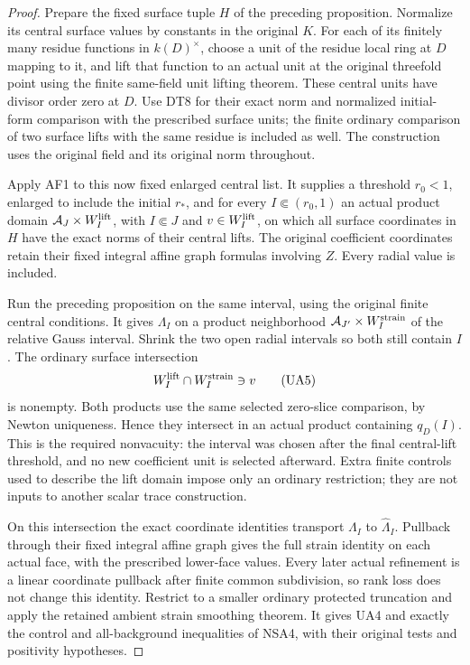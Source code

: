 \begin{proof}
Prepare the fixed surface tuple \(H\) of the preceding
proposition.  Normalize its central surface values
by constants in the original \(K\).  For each of its
finitely many residue functions in \(k(D)^\times\),
choose a unit of the residue local ring at \(D\)
mapping to it, and lift that function to an actual
unit at the original threefold point using the
finite same-field unit lifting theorem.  These
central units have divisor order zero at \(D\).
Use DT8 for their exact norm and normalized
initial-form comparison with the prescribed
surface units; the finite ordinary comparison
of two surface lifts with the same residue is
included as well.  The construction uses the
original field and its original norm throughout.

Apply AF1 to this now fixed enlarged central list.
It supplies a threshold \(r_0<1\), enlarged to
include the initial \(r_*\), and for every
\(I\Subset(r_0,1)\) an actual product domain
\(\mathcal A_J\times W_I^{\rm lift}\), with
\(I\Subset J\) and \(v\in W_I^{\rm lift}\),
on which all surface coordinates in \(H\) have
the exact norms of their central lifts.  The
original coefficient coordinates retain their
fixed integral affine graph formulas involving
\(Z\).  Every radial value is included.

Run the preceding proposition on the same
interval, using the original finite central
conditions.  It gives \(\Lambda_I\) on a
product neighborhood
\(\mathcal A_{J'}\times W_I^{\rm strain}\)
of the relative Gauss interval.  Shrink the
two open radial intervals so both still
contain \(I\).  The ordinary surface
intersection
\[
       W_I^{\rm lift}\cap W_I^{\rm strain}
                          \ni v
\tag{UA5}
\]
is nonempty.  Both products use the same
selected zero-slice comparison, by Newton
uniqueness.  Hence they intersect in an
actual product containing \(q_D(I)\).
This is the required nonvacuity: the interval
was chosen after the final central-lift
threshold, and no new coefficient unit is
selected afterward.  Extra finite controls
used to describe the lift domain impose
only an ordinary restriction; they are not
inputs to another scalar trace construction.

On this intersection the exact coordinate
identities transport \(\Lambda_I\) to
\(\widehat\Lambda_I\).  Pullback through
their fixed integral affine graph gives
the full strain identity on each actual
face, with the prescribed lower-face
values.  Every later actual refinement
is a linear coordinate pullback after
finite common subdivision, so rank loss
does not change this identity.  Restrict
to a smaller ordinary protected truncation
and apply the retained ambient strain
smoothing theorem.  It gives UA4 and
exactly the control and all-background
inequalities of NSA4, with their original
tests and positivity hypotheses.
\end{proof}

